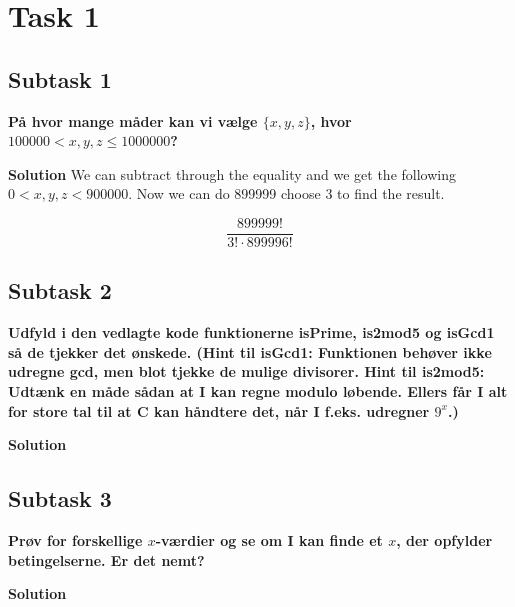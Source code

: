 
\section{Task 1}
\subsection{Subtask 1}
\noindent
\textbf{På hvor mange måder kan vi vælge $\{x,y,z\}$, hvor $100000<x,y,z\leq 1000000$?}

\bigskip
\noindent
\textbf{Solution}
We can subtract through the equality and we get the following $0<x,y,z<900000$. Now we can do 899999 choose 3 to find the result.

\begin{equation}
    \frac{899999!}{3!\cdot899996!}
\end{equation}

\subsection{Subtask 2}
\noindent
\textbf{Udfyld i den vedlagte kode funktionerne isPrime, is2mod5 og isGcd1 så de tjekker det ønskede. (Hint til isGcd1: Funktionen behøver ikke udregne gcd, men blot tjekke de mulige divisorer. Hint til is2mod5: Udtænk en måde sådan at I kan regne modulo løbende. Ellers får I alt for store tal til at C kan håndtere det, når I f.eks. udregner $9^x$.)}

\bigskip
\noindent
\textbf{Solution}

\subsection{Subtask 3}
\noindent
\textbf{Prøv for forskellige $x$-værdier og se om I kan finde et $x$, der opfylder betingelserne. Er det nemt?}

\bigskip
\noindent
\textbf{Solution}
